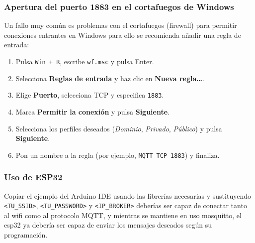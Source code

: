 \documentclass[12pt, a4paper]{article}
\begin{document}
\begin{umaappendices}
		\subsubsection{Apertura del puerto 1883 en el cortafuegos  de Windows}
		Un fallo muy común es problemas con el cortafuegos (firewall) para permitir conexiones entrantes en Windows para ello se recomienda añadir una regla de entrada:
		
		\begin{enumerate}
			\item Pulsa \texttt{Win + R}, escribe \texttt{wf.msc} y pulsa Enter.
			\item Selecciona \textbf{Reglas de entrada} y haz clic en \textbf{Nueva regla\ldots}.
			\item Elige \textbf{Puerto}, selecciona TCP y especifica \texttt{1883}.
			\item Marca \textbf{Permitir la conexión} y pulsa \textbf{Siguiente}.
			\item Selecciona los perfiles deseados (\emph{Dominio}, \emph{Privado}, \emph{Público}) y pulsa \textbf{Siguiente}.
			\item Pon un nombre a la regla (por ejemplo, \texttt{MQTT TCP 1883}) y finaliza.
		\end{enumerate}
		
		\subsubsection{Uso de ESP32}
		Copiar el ejemplo del Arduino IDE usando las librerías necesarias y sustituyendo \texttt{<TU\_SSID>}, \texttt{<TU\_PASSWORD>} y \texttt{<IP\_BROKER>} deberías ser capaz de conectar tanto al wifi como al protocolo MQTT, y mientras se mantiene en uso mosquitto, el esp32 ya debería ser capaz de enviar los mensajes deseados según su programación.
		
	
\end{umaappendices}
\end{document}
